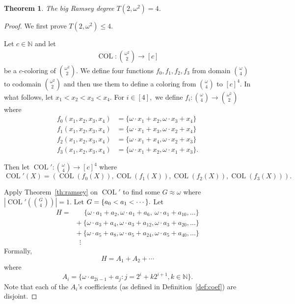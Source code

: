 \documentclass[10pt,a4paper]{article}
\newcommand{\om}{\omega}
\newcommand{\oequiv}{\approx}
\newcommand{\setconcat}{+}
\newcommand{\COL}{\operatorname{COL}}
\newcommand{\N}{\mathbb{N}}
\newcommand{\numcolors}{c}
\newcommand{\commonconst}{a}
\newcommand{\Commonconst}{A}
\theoremstyle{plain}
\newtheorem{theorem}{Theorem}[section]
\theoremstyle{definition}
\begin{document}
\begin{theorem}\label{th:om2} 
The big Ramsey degree $T(2,\om^2)=4$.
\end{theorem} 
\begin{proof}
We first prove $T\left(2, \om^2\right) \leq 4$.

Let $\numcolors \in \N$ and let \begin{align*}
    \COL \colon \binom{\om^2}{2} \to [\numcolors]
\end{align*}
be a $\numcolors$-coloring of $\binom{\om^2}{2}$. 
We define four functions $f_0,f_1,f_2,f_3$ from 
domain $\binom{\om}{4}$ to codomain $\binom{\om^2}{2}$ and then use them to define a coloring 
from 
$\binom{\om}{4}$ to $[\numcolors]^4$.
In what follows, 
let $x_1<x_2<x_3<x_4$. For $i \in [4],$ we define $f_i \colon \binom{\om}{4} \to \binom{\om^2}{2}$ where \begin{align*}
f_0(x_1,x_2,x_3,x_4)  &= \{\om \cdot x_1 + x_2, \om \cdot x_3 + x_4\}\\
f_1(x_1,x_2,x_3,x_4)  &= \{\om \cdot x_1 + x_3, \om \cdot x_2 + x_4\}\\
f_2(x_1,x_2,x_3,x_4)  &= \{\om \cdot x_1 + x_4, \om \cdot x_2 + x_3\}\\
f_3(x_1,x_2,x_3,x_4)  &= \{\om \cdot x_1 + x_2, \om \cdot x_1 + x_3\}.
\end{align*}

Then let
$\COL' \colon \binom{\om}{4} \to [\numcolors]^4$ where
$$\COL'(X) =(\COL(f_0(X)),
\COL(f_1(X)),
\COL(f_2(X)),
\COL(f_3(X))
).
$$

Apply Theorem~\ref{th:ramsey} on $\COL'$ to find some $G \oequiv \omega$ where 
$\left|\COL' \left( \binom{G}{4} \right)\right|=1$.
Let $G = \{\commonconst_0 <\nobreak \commonconst_1 <\nobreak \cdots\}.$ Let
\begin{align*}
H = & ~~~~\!~\{\om \cdot \commonconst_{1} + \commonconst_2, \om \cdot \commonconst_{1} + \commonconst_6,~\om \cdot \commonconst_{1} + \commonconst_{10}, \ldots\} \\
 & \setconcat ~\{\om \cdot \commonconst_{3} + \commonconst_{4}, \om \cdot \commonconst_{3} + \commonconst_{12}, \om \cdot \commonconst_{3} + \commonconst_{20}, \ldots\}\\
 & \setconcat~\{\om \cdot \commonconst_{5} + \commonconst_{8}, \om \cdot \commonconst_{5} + \commonconst_{24}, \om \cdot \commonconst_{5} + \commonconst_{40}, \ldots\}\\
& ~~\!\vdots
\end{align*}
Formally, $$
H = \Commonconst_1 \setconcat \Commonconst_2 \setconcat \cdots
$$ where $$
\Commonconst_i = \{\om\cdot \commonconst_{2i-1} + \commonconst_j \colon j = 2^i + k 2^{i+1}, k \in \N\}.
$$
Note that each of the $A_i$'s coefficients
(as defined in Definition~\ref{def:coef}) 
are disjoint.


\end{proof}
\end{document}
